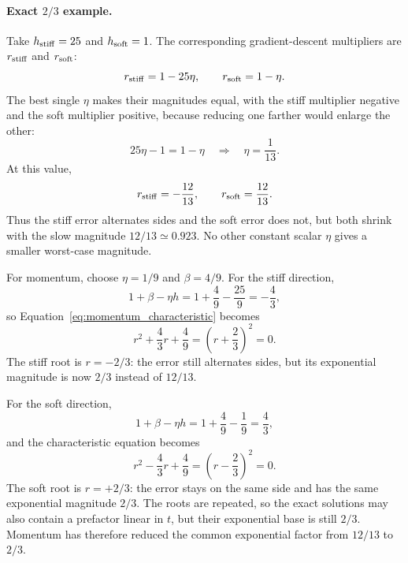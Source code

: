 \documentclass[11pt,letterpaper]{article}
\begin{document}
\paragraph{Exact \(2/3\) example.}
Take \(h_{\rm stiff}=25\) and \(h_{\rm soft}=1\). The corresponding
gradient-descent multipliers are \(r_{\rm stiff}\) and \(r_{\rm soft}\):
\begin{equation}
  r_{\rm stiff}=1-25\eta,
  \qquad
  r_{\rm soft}=1-\eta.
\end{equation}
The best single \(\eta\) makes their magnitudes equal, with the stiff
multiplier negative and the soft multiplier positive, because reducing one
farther would enlarge the other:
\begin{equation}
  25\eta-1=1-\eta
  \quad\Longrightarrow\quad
  \eta=\frac1{13}.
\end{equation}
At this value,
\begin{equation}
  r_{\rm stiff}=-\frac{12}{13},
  \qquad
  r_{\rm soft}=\frac{12}{13}.
\end{equation}
Thus the stiff error alternates sides and the soft error does not, but both
shrink with the slow magnitude \(12/13\simeq0.923\). No other constant scalar
\(\eta\) gives a smaller worst-case magnitude.

For momentum, choose \(\eta=1/9\) and \(\beta=4/9\).
For the stiff direction,
\begin{equation}
  1+\beta-\eta h
  =1+\frac49-\frac{25}{9}
  =-\frac43,
\end{equation}
so Equation~\eqref{eq:momentum_characteristic} becomes
\begin{equation}
  r^2+\frac43r+\frac49
  =\left(r+\frac23\right)^2=0.
\end{equation}
The stiff root is \(r=-2/3\): the error still alternates sides, but its
exponential magnitude is now \(2/3\) instead of \(12/13\).

For the soft direction,
\begin{equation}
  1+\beta-\eta h
  =1+\frac49-\frac19
  =\frac43,
\end{equation}
and the characteristic equation becomes
\begin{equation}
  r^2-\frac43r+\frac49
  =\left(r-\frac23\right)^2=0.
\end{equation}
The soft root is \(r=+2/3\): the error stays on the same side and has the same
exponential magnitude \(2/3\). The roots are repeated, so the exact solutions
may also contain a prefactor linear in \(t\), but their exponential base is
still \(2/3\). Momentum has therefore reduced the common exponential factor
from \(12/13\) to \(2/3\).
\end{document}
